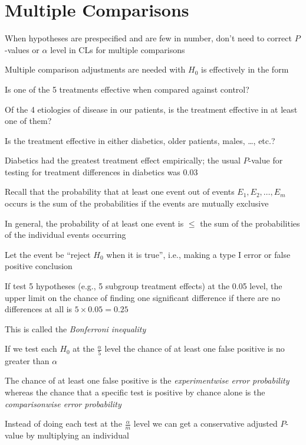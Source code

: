 \section{Multiple Comparisons}\label{multcomp} 
\bi
\item When hypotheses are prespecified and are few in number, don't
  need to correct $P$-values or $\alpha$ level in CLs for multiple
  comparisons
\item Multiple comparison adjustments are needed with $H_{0}$ is
  effectively in the form 
 \bi 
 \item Is one of the 5 treatments effective when compared against
   control?
 \item Of the 4 etiologies of disease in our patients, is the
   treatment effective in at least one of them?
 \item Is the treatment effective in either diabetics, older patients,
   males, \ldots, etc.?
 \item Diabetics had the greatest treatment effect empirically; the
   usual $P$-value for testing for treatment differences in diabetics
   was 0.03 
 \ei
\item Recall that the probability that at least one event out of
  events $E_{1}, E_{2}, \ldots, E_{m}$ occurs is the sum of the
  probabilities if the events are mutually exclusive
\item In general, the probability of at least one event is $\leq$ the
  sum of the probabilities of the individual events occurring
\item Let the event be ``reject $H_0$ when it is true'', i.e., making
  a type I error or false positive conclusion
\item If test 5 hypotheses (e.g., 5 subgroup treatment effects) at the
  0.05 level, the upper limit on the chance of finding one significant
  difference if there are no differences at all is $5 \times 0.05 =
  0.25$
\item This is called the \emph{Bonferroni inequality}
\item If we test each $H_0$ at the $\frac{\alpha}{5}$ level the chance
  of at least one false positive is no greater than $\alpha$
\item The chance of at least one false positive is the
  \emph{experimentwise error probability} whereas the chance that a
  specific test is positive by chance alone is the
  \emph{comparisonwise error probability}
\item Instead of doing each test at the $\frac{\alpha}{m}$ level we can
  get a conservative adjusted $P$-value by multiplying an individual
